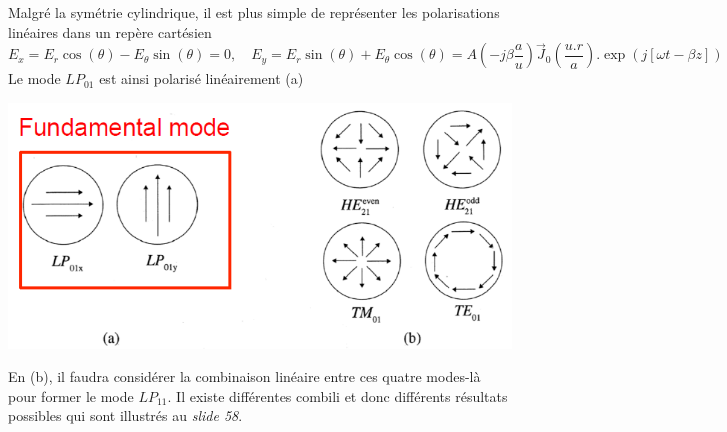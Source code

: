 \begin{enumerate}
Malgré la symétrie cylindrique, il est plus simple de représenter les polarisations linéaires
dans un repère cartésien
\begin{equation}
{E_x} = {E_r}\cos (\theta ) - {E_\theta }\sin (\theta ) = 0,\quad
{E_y} = {E_r}\sin (\theta ) + {E_\theta }\cos (\theta ) = A( - j\beta \frac{a}{u}){\vec{J}_0}(\frac{{u.r}}{a}).\exp (j[\omega t - \beta z])
\end{equation}
Le mode $LP_{01}$ est ainsi polarisé linéairement (a)
\begin{center}
	\includegraphics[scale=0.4]{ch1/image26}
\end{center}
En (b), il faudra considérer la combinaison linéaire entre ces quatre modes-là pour former le 
mode $LP_{11}$. Il existe différentes combili et donc différents résultats possibles qui sont
illustrés au \textit{slide 58}.\\


\end{enumerate}
